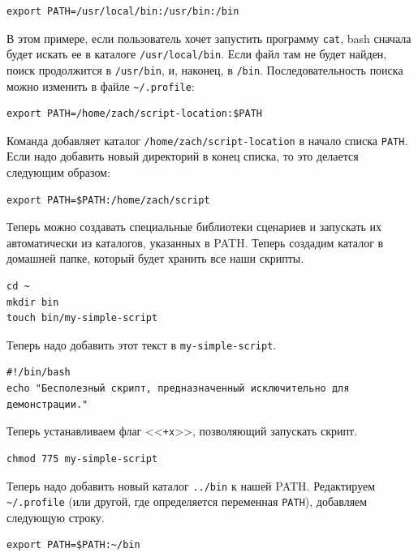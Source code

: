 \documentclass[a4paper,12pt,final,openany]{extbook}
\begin{document}
\begin{verbatim}
export PATH=/usr/local/bin:/usr/bin:/bin
\end{verbatim}

В этом примере, если пользователь хочет запустить программу
\texttt{cat}, bash сначала будет искать ее в каталоге
\texttt{/usr/local/bin}. Если файл там не будет найден, поиск продолжится в
\texttt{/usr/bin}, и, наконец, в \texttt{/bin}. Последовательность поиска можно изменить
в файле \texttt{\textasciitilde{}/.profile}:

\begin{verbatim}
export PATH=/home/zach/script-location:$PATH
\end{verbatim}

Команда добавляет каталог \texttt{/home/zach/script-location} в
начало списка \texttt{PATH}. Если надо добавить новый директорий
в конец списка, то это делается следующим образом:

\begin{verbatim}
export PATH=$PATH:/home/zach/script
\end{verbatim}

Теперь можно создавать специальные библиотеки сценариев и запускать их
автоматически из каталогов, указанных в PATH. Теперь создадим каталог
в домашней папке, который будет хранить все наши скрипты.

\begin{verbatim}
cd ~
mkdir bin
touch bin/my-simple-script
\end{verbatim}

Теперь надо добавить этот текст в \texttt{my-simple-script}.

\begin{verbatim}
#!/bin/bash
echo "Бесполезный скрипт, предназначенный исключительно для демонстрации."
\end{verbatim}

Теперь устанавливаем флаг <<\texttt{+x}>>, позволяющий запускать скрипт.

\begin{verbatim}
chmod 775 my-simple-script
\end{verbatim}

Теперь надо добавить новый каталог \texttt{../bin} к нашей PATH.
Редактируем \texttt{\textasciitilde{}/.profile} (или другой, где
определяется переменная \texttt{PATH}), добавляем следующую строку.

\begin{verbatim}
export PATH=$PATH:~/bin
\end{verbatim}
\end{document}
